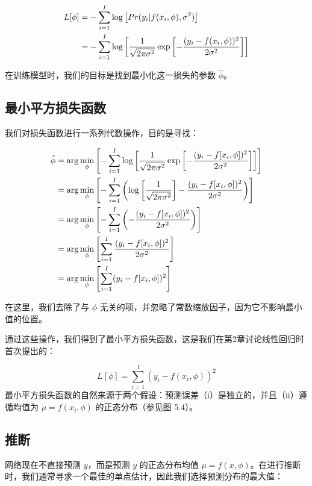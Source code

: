 \documentclass[lang=cn,newtx,10pt,scheme=chinese]{elegantbook}
\begin{document}
\begin{align}
	L[\phi] &= - \sum_{i=1}^{I} \log \left[ Pr(y_i|f(x_i, \phi), \sigma^2) \right] \notag \\
	&= - \sum_{i=1}^{I} \log \left[ \frac{1}{\sqrt{2\pi\sigma^2}} \exp \left[ -\frac{(y_i - f(x_i, \phi))^2}{2\sigma^2} \right] \right] 
\end{align}

在训练模型时，我们的目标是找到最小化这一损失的参数 \(\hat{\phi}\)。

\subsection{最小平方损失函数}

我们对损失函数进行一系列代数操作，目的是寻找：


\begin{align}
\hat{\phi} &= \arg\min_{\phi} \left[ -\sum_{i=1}^{I} \log \left[ \frac{1}{\sqrt{2\pi\sigma^2}} \exp \left[ -\frac{(y_i - f[x_i, \phi])^2}{2\sigma^2} \right] \right] \right] \notag \\
&= \arg\min_{\phi} \left[ -\sum_{i=1}^{I} \left( \log \left[ \frac{1}{\sqrt{2\pi\sigma^2}} \right] - \frac{(y_i - f[x_i, \phi])^2}{2\sigma^2} \right) \right] \notag \\
&= \arg\min_{\phi} \left[ -\sum_{i=1}^{I} \left( -\frac{(y_i - f[x_i, \phi])^2}{2\sigma^2} \right) \right] \notag \\
&= \arg\min_{\phi} \left[ \sum_{i=1}^{I} \frac{(y_i - f[x_i, \phi])^2}{2\sigma^2} \right] \notag \\
&= \arg\min_{\phi} \left[ \sum_{i=1}^{I} (y_i - f[x_i, \phi])^2 \right]
\end{align}

在这里，我们去除了与 \(\phi\) 无关的项，并忽略了常数缩放因子，因为它不影响最小值的位置。

通过这些操作，我们得到了最小平方损失函数，这是我们在第2章讨论线性回归时首次提出的：

\begin{equation}
L[\phi] = \sum_{i=1}^{I} (y_i - f(x_i, \phi))^2 
\end{equation}
最小平方损失函数的自然来源于两个假设：预测误差（i）是独立的，并且（ii）遵循均值为 \(\mu = f(x_i, \phi)\) 的正态分布（参见图 5.4）。


\subsection{推断}

网络现在不直接预测 \(y\)，而是预测 \(y\) 的正态分布均值 \(\mu = f(x, \phi)\)。在进行推断时，我们通常寻求一个最佳的单点估计，因此我们选择预测分布的最大值：
\end{document}
